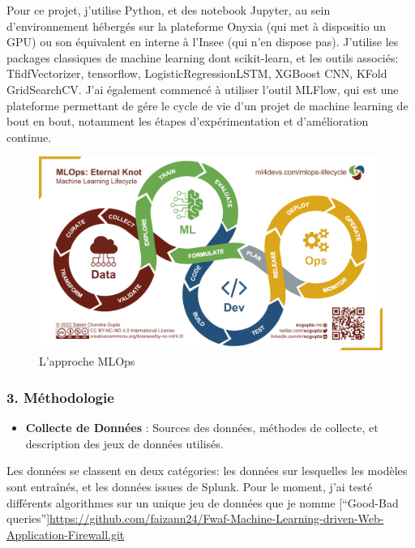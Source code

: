 \documentclass[
  letterpaper,
  DIV=11,
  numbers=noendperiod]{scrartcl}
\providecommand{\tightlist}{%
  \setlength{\itemsep}{0pt}\setlength{\parskip}{0pt}}\usepackage{longtable,booktabs,array}
\begin{document}
Pour ce projet, j'utilise Python, et des notebook Jupyter, au sein
d'environnement hébergés sur la plateforme Onyxia (qui met à dispositio
un GPU) ou son équivalent en interne à l'Insee (qui n'en dispose pas).
J'utilise les packages classiques de machine learning dont scikit-learn,
et les outils associés: TfidfVectorizer, tensorflow,
LogisticRegressionLSTM, XGBoost CNN, KFold GridSearchCV. J'ai également
commencé à utiliser l'outil MLFlow, qui est une plateforme permettant de
gére le cycle de vie d'un projet de machine learning de bout en bout,
notamment les étapes d'expérimentation et d'amélioration continue.

\begin{figure}[H]

{\centering \includegraphics{images/mlops.png}

}

\caption{L'approche MLOps}

\end{figure}%

\subsubsection{3. Méthodologie}\label{muxe9thodologie}

\begin{itemize}
\tightlist
\item
  \textbf{Collecte de Données} : Sources des données, méthodes de
  collecte, et description des jeux de données utilisés.
\end{itemize}

Les données se classent en deux catégories: les données sur lesquelles
les modèles sont entraînés, et les données issues de Splunk. Pour le
moment, j'ai testé différents algorithmes sur un unique jeu de données
que je nomme {[}``Good-Bad
queries''{]}\url{https://github.com/faizann24/Fwaf-Machine-Learning-driven-Web-Application-Firewall.git}
\end{document}
